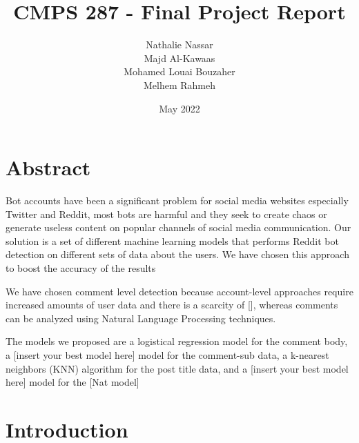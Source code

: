 \documentclass{article}
\title{CMPS 287 - Final Project Report}
\author{Nathalie Nassar \\Majd Al-Kawaas\\ Mohamed Louai Bouzaher\\ Melhem Rahmeh}
\date{May 2022}
\begin{document}
\maketitle

\section{Abstract}
Bot accounts have been a significant problem for social media websites especially Twitter and Reddit, most bots are harmful and they seek to create chaos or generate useless content on popular channels of social media communication. Our solution is a set of different machine learning models that performs Reddit bot detection 
on different sets of data about the users. We have chosen this approach to boost the accuracy of the results

We have chosen comment level detection because account-level approaches require increased amounts of user data and there is a scarcity of [], whereas comments can be analyzed using Natural Language Processing techniques.

The models we proposed are a logistical regression model for the comment body, a [insert your best model here] model for the comment-sub data, a k-nearest neighbors (KNN) algorithm for the post title data, and a [insert your best model here] model for the [Nat model]

\section{Introduction}
\end{document}
